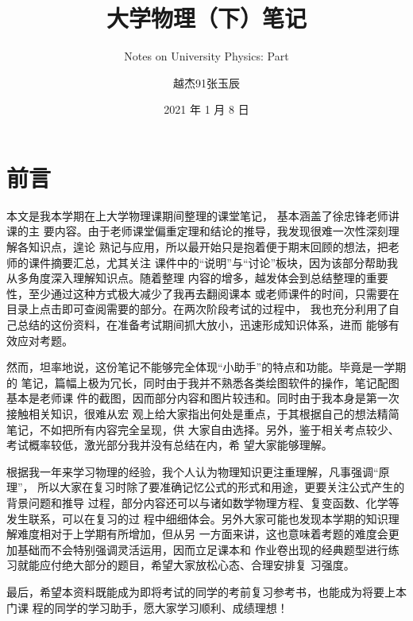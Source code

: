 \documentclass[
  10pt,
  twoside,
  openany,
  b5paper, %
  colorscheme = basic, %
]{qyxf-book}
\title{大学物理（下）笔记}
\subtitle{Notes on University Physics: Part \uppercase\expandafter{\romannumeral2}}  %
\author{越杰91张玉辰}
\date{2021 年 1 月 8 日}
\begin{document}
\maketitle

\chapter*{前言}
\thispagestyle{empty}

本文是我本学期在上大学物理课期间整理的课堂笔记， 基本涵盖了徐忠锋老师讲课的主
要内容。由于老师课堂偏重定理和结论的推导，我发现很难一次性深刻理解各知识点，遑论
熟记与应用，所以最开始只是抱着便于期末回顾的想法，把老师的课件摘要汇总，尤其关注
课件中的“说明”与“讨论”板块，因为该部分帮助我从多角度深入理解知识点。随着整理
内容的增多，越发体会到总结整理的重要性，至少通过这种方式极大减少了我再去翻阅课本
或老师课件的时间，只需要在目录上点击即可查阅需要的部分。在两次阶段考试的过程中，
我也充分利用了自己总结的这份资料，在准备考试期间抓大放小，迅速形成知识体系，进而
能够有效应对考题。

然而，坦率地说，这份笔记不能够完全体现“小助手”的特点和功能。毕竟是一学期的
笔记，篇幅上极为冗长，同时由于我并不熟悉各类绘图软件的操作，笔记配图基本是老师课
件的截图，因而部分内容和图片较违和。同时由于我本身是第一次接触相关知识，很难从宏
观上给大家指出何处是重点，于其根据自己的想法精简笔记，不如把所有内容完全呈现，供
大家自由选择。另外，鉴于相关考点较少、考试概率较低，激光部分我并没有总结在内，希
望大家能够理解。

根据我一年来学习物理的经验，我个人认为物理知识更注重理解，凡事强调“原理”，
所以大家在复习时除了要准确记忆公式的形式和用途，更要关注公式产生的背景问题和推导
过程，部分内容还可以与诸如数学物理方程、复变函数、化学等发生联系，可以在复习的过
程中细细体会。另外大家可能也发现本学期的知识理解难度相对于上学期有所增加，但从另
一方面来讲，这也意味着考题的难度会更加基础而不会特别强调灵活运用，因而立足课本和
作业卷出现的经典题型进行练习就能应付绝大部分的题目，希望大家放松心态、合理安排复
习强度。

最后，希望本资料既能成为即将考试的同学的考前复习参考书，也能成为将要上本门课
程的同学的学习助手，愿大家学习顺利、成绩理想！





\newpage
\setcounter{page}{1}

\end{document}
